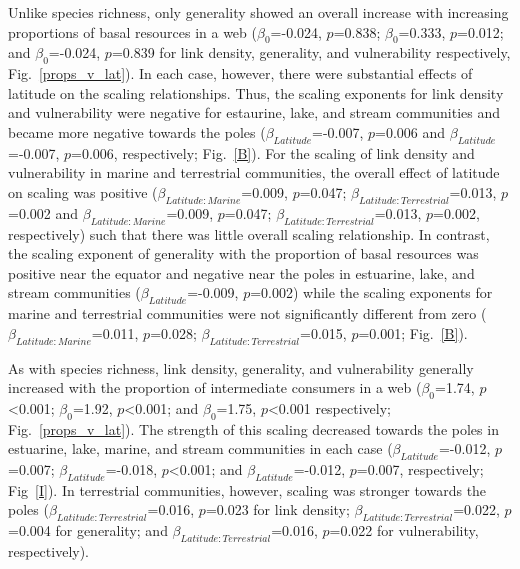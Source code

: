 \documentclass[12pt]{article}
\begin{document}
\begin{spacing}{1.0}
  Unlike species richness, only generality showed an overall increase with increasing
  proportions of basal resources in a web ($\beta_0$=-0.024, $p$=0.838;
  $\beta_0$=0.333, $p$=0.012; and $\beta_0$=-0.024, $p$=0.839 for link
  density, generality, and vulnerability respectively,
  Fig.~\ref{props_v_lat}). In each case, however, there were substantial
  effects of latitude on the scaling relationships. Thus, the scaling
  exponents for link density and vulnerability were negative for estaurine,
  lake, and stream communities and became more negative towards the poles
  ($\beta_{Latitude}$=-0.007, $p$=0.006 and $\beta_{Latitude}$=-0.007,
  $p$=0.006, respectively; Fig.~\ref{B}). For the scaling of link density and
  vulnerability in marine and terrestrial communities, the overall effect of
  latitude on scaling was positive ($\beta_{Latitude:Marine}$=0.009,
  $p$=0.047; $\beta_{Latitude:Terrestrial}$=0.013, $p$=0.002 and
  $\beta_{Latitude:Marine}$=0.009, $p$=0.047;
  $\beta_{Latitude:Terrestrial}$=0.013, $p$=0.002, respectively) such that
  there was little overall scaling relationship. In contrast, the scaling
  exponent of generality with the proportion of basal resources was positive
  near the equator and negative near the poles in estuarine, lake, and stream
  communities ($\beta_{Latitude}$=-0.009, $p$=0.002) while the scaling
  exponents for marine and terrestrial communities were not significantly
  different from zero ($\beta_{Latitude:Marine}$=0.011, $p$=0.028;
  $\beta_{Latitude:Terrestrial}$=0.015, $p$=0.001; Fig.~\ref{B}).


  As with species richness, link density, generality, and vulnerability
  generally increased with the proportion of intermediate consumers in a web
  ($\beta_0$=1.74, $p$\textless0.001; $\beta_0$=1.92, $p$\textless0.001; and
  $\beta_0$=1.75, $p$\textless0.001 respectively; Fig.~\ref{props_v_lat}).
  The strength of this scaling decreased towards the poles in estuarine,
  lake, marine, and stream communities in each case
  ($\beta_{Latitude}$=-0.012, $p$=0.007; $\beta_{Latitude}$=-0.018,
  $p$\textless0.001; and $\beta_{Latitude}$=-0.012, $p$=0.007, respectively;
  Fig~\ref{I}). In terrestrial communities, however, scaling was stronger
  towards the  poles ($\beta_{Latitude:Terrestrial}$=0.016, $p$=0.023 for
  link density; $\beta_{Latitude:Terrestrial}$=0.022, $p$=0.004 for
  generality; and $\beta_{Latitude:Terrestrial}$=0.016, $p$=0.022 for
  vulnerability, respectively).



\end{spacing}
\end{document}
